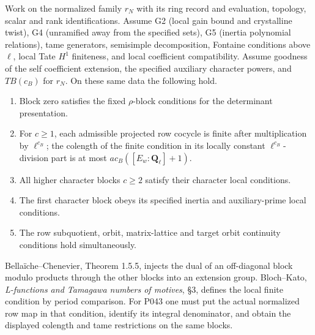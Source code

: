 \begin{formalstatement}\label{pn:P043}
Work on the normalized family \(r_N\) with its ring record and evaluation, topology, scalar and rank identifications. Assume G2 (local gain bound and crystalline twist), G4 (unramified away from the specified sets), G5 (inertia polynomial relations), tame generators, semisimple decomposition, Fontaine conditions above \(\ell\), local Tate \(H^1\) finiteness, and local coefficient compatibility. Assume goodness of the self coefficient extension, the specified auxiliary character powers, and \(TB(c_B)\) for \(r_N\). On these same data the following hold.
\begin{enumerate}
\item Block zero satisfies the fixed \(\rho\)-block conditions for the determinant presentation.
\item For \(c\ge1\), each admissible projected row cocycle is finite after multiplication by \(\ell^{c_B}\); the colength of the finite condition in its locally constant \(\ell^{c_B}\)-division part is at most \(ac_B([E_w:\mathbf Q_\ell]+1)\).
\item All higher character blocks \(c\ge2\) satisfy their character local conditions.
\item The first character block obeys its specified inertia and auxiliary-prime local conditions.
\item The row subquotient, orbit, matrix-lattice and target orbit continuity conditions hold simultaneously.
\end{enumerate}
\end{formalstatement}
Bellaïche--Chenevier, Theorem 1.5.5, injects the dual of an off-diagonal block modulo products through the other blocks into an extension group. Bloch--Kato, \emph{L-functions and Tamagawa numbers of motives}, \S3, defines the local finite condition by period comparison. For P043 one must put the actual normalized row map in that condition, identify its integral denominator, and obtain the displayed colength and tame restrictions on the same blocks.
